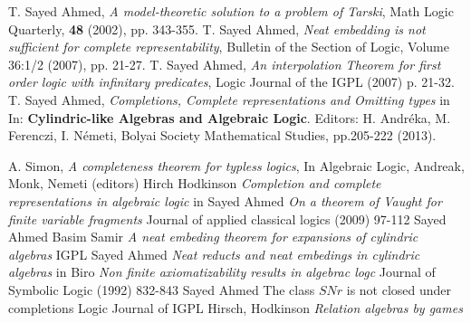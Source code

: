 \documentclass[12pt]{article}
\newcounter{item}[section]
\theoremstyle{definition}
\begin{document}
\begin{thebibliography}{}
 T. Sayed Ahmed, {\it A model-theoretic solution to a problem of Tarski}, Math Logic Quarterly, \textbf{48} (2002), pp. 343-355.
 T. Sayed Ahmed, \emph{Neat embedding is not sufficient for complete representability}, Bulletin of the Section of Logic, Volume 36:1/2 (2007), pp. 21-27.
 T. Sayed Ahmed, {\it An interpolation Theorem for first order logic with infinitary predicates}, Logic Journal of the IGPL (2007) p.  21-32.
 T. Sayed Ahmed, {\it Completions, Complete representations and Omitting types} in \cite{1}
In: {\bf Cylindric-like Algebras and Algebraic Logic}. Editors: H. Andr\'eka, M. Ferenczi, I. N\'emeti, Bolyai Society Mathematical Studies, pp.205-222 (2013).

 A. Simon, {\it A completeness theorem for typless logics}, In Algebraic Logic, Andreak, Monk, Nemeti (editors)
 Hirch Hodkinson {\it Completion and complete representations in algebraic logic } in \cite{1}
 Sayed Ahmed {\it On a theorem of Vaught for finite variable fragments} Journal of  applied  classical logics (2009) 97-112
 Sayed Ahmed Basim Samir {\it A neat embeding theorem for expansions of cylindric algebras} IGPL
 Sayed Ahmed {\it Neat reducts and neat embedings in cylindric algebras} in \cite{1}
 Biro {\it Non finite axiomatizability results in algebrac logc } Journal of Symbolic Logic (1992) 832-843
 Sayed Ahmed { The class $SNr$ is not closed under completions} Logic Journal of IGPL
 Hirsch, Hodkinson {\it Relation algebras by games}
\end{thebibliography}
\end{document}
